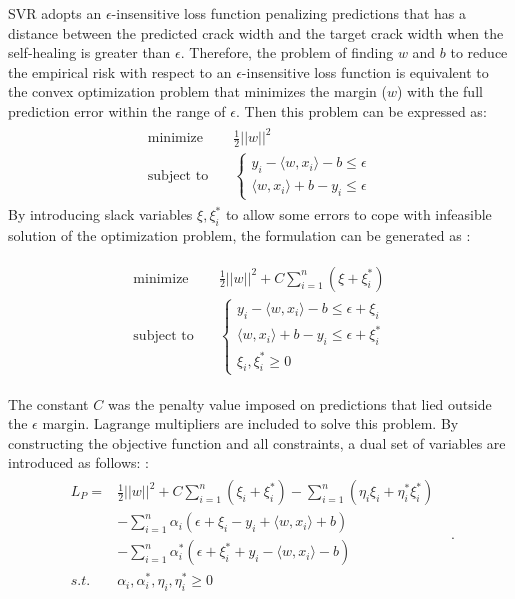 \documentclass[11pt]{article}
\begin{document}
	SVR adopts an $\epsilon$-insensitive loss function penalizing predictions that has a distance between the predicted crack width and the target crack width when the self-healing is greater than $\epsilon$. Therefore, the problem of finding $w$ and $b$ to reduce the empirical risk with respect to an $\epsilon$-insensitive loss function is equivalent to the convex optimization problem that minimizes the margin ($w$) with the full prediction error within the range of $\epsilon$. Then this problem can be expressed as: 
	\begin{eqnarray} \label{svr2}
	\begin{aligned}
	\text{minimize} \quad& \frac{1}{2} ||w||^2 \\
	\text{subject to} \quad & 
	\left  \{ 
	\begin{array}{l}
	y_i -\langle w,x_i \rangle -b \le \epsilon \\
	\langle w,x_i \rangle +b -y_i \le \epsilon
	\end{array}
	\right.
	\end{aligned}                                                            
	\end{eqnarray}
	By introducing slack variables $\xi, \xi_i^*$ to allow some errors to cope with infeasible solution of the optimization problem, the formulation can be generated as \cite{vapnik1999overview}: 
	
	\begin{eqnarray}
	\begin{aligned}
	\text{minimize} \quad &  \frac{1}{2} ||w||^2 + C \sum_{i=1}^{n}(\xi + \xi_i^*) \\
	\text{subject to} \quad& 
	\left \{
	\begin{array}{l}
	y_i - \langle w, x_i \rangle -b \le \epsilon + \xi_i \\
	\langle w, x_i \rangle + b - y_i \le  \epsilon + \xi_i^* \\
	\xi_i, \xi_i^* \ge 0 
	\end{array}
	\right.
	\end{aligned}                                                              
	\end{eqnarray}
	
	The constant $C$ was the penalty value imposed on predictions that lied outside the $\epsilon$ margin. Lagrange multipliers are included to solve this problem. By constructing the objective function and all constraints, a dual set of variables are introduced as follows: \cite{yuvaraj2013support}:
	\begin{eqnarray}
	\begin{aligned}
	L_P  = & \frac{1}{2} ||w||^2 +C\sum_{i=1}^{n} (\xi_i + \xi_i^*) - \sum_{i=1}^{n} (\eta_i \xi_i + \eta_i^* \xi_i^*) \\
	& -\sum_{i=1}^{n} \alpha_i (\epsilon + \xi_i - y_i + \langle w, x_i \rangle + b) \\
	& - \sum_{i=1}^{n} \alpha_i^* (\epsilon + \xi_i^* +y_i - \langle w, x_i \rangle -b )
	& \\
	s.t. \quad & \alpha_i, \alpha_i^*, \eta_i, \eta_i^* \ge 0 
	\end{aligned}.                                                               
	\end{eqnarray}
	
\end{document}
